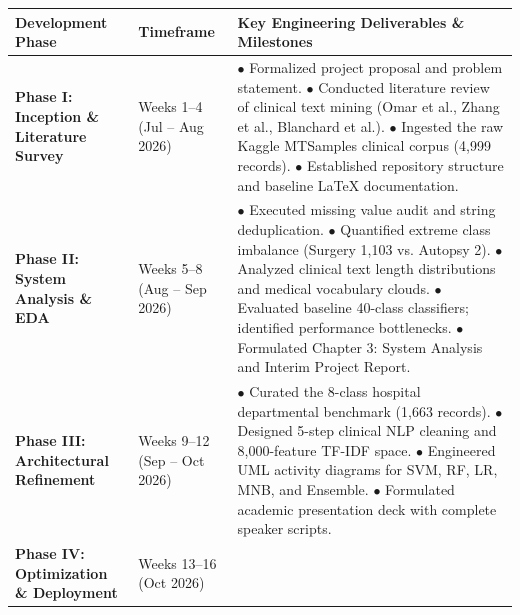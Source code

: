 \begin{table}[H]
\centering
\footnotesize
\renewcommand{\arraystretch}{0.95}
\setlength{\tabcolsep}{4pt}
\begin{tabularx}{\linewidth}{|>{\raggedright\arraybackslash}p{2.6cm}|>{\raggedright\arraybackslash}p{2.4cm}|>{\raggedright\arraybackslash}X|}
\hline
\textbf{Development Phase} & \textbf{Timeframe} & \textbf{Key Engineering Deliverables \& Milestones} \\
\hline
\textbf{Phase I: Inception \& Literature Survey} & Weeks 1--4 \newline (Jul -- Aug 2026) & 
$\bullet$ Formalized project proposal and problem statement. \newline
$\bullet$ Conducted literature review of clinical text mining (Omar et al., Zhang et al., Blanchard et al.). \newline
$\bullet$ Ingested the raw Kaggle MTSamples clinical corpus (4,999 records). \newline
$\bullet$ Established repository structure and baseline LaTeX documentation. \\
\hline
\textbf{Phase II: System Analysis \& EDA} & Weeks 5--8 \newline (Aug -- Sep 2026) & 
$\bullet$ Executed missing value audit and string deduplication. \newline
$\bullet$ Quantified extreme class imbalance (Surgery 1,103 vs. Autopsy 2). \newline
$\bullet$ Analyzed clinical text length distributions and medical vocabulary clouds. \newline
$\bullet$ Evaluated baseline 40-class classifiers; identified performance bottlenecks. \newline
$\bullet$ Formulated Chapter 3: System Analysis and Interim Project Report. \\
\hline
\textbf{Phase III: Architectural Refinement} & Weeks 9--12 \newline (Sep -- Oct 2026) & 
$\bullet$ Curated the 8-class hospital departmental benchmark (1,663 records). \newline
$\bullet$ Designed 5-step clinical NLP cleaning and 8,000-feature TF-IDF space. \newline
$\bullet$ Engineered UML activity diagrams for SVM, RF, LR, MNB, and Ensemble. \newline
$\bullet$ Formulated academic presentation deck with complete speaker scripts. \\
\hline
\textbf{Phase IV: Optimization \& Deployment} & Weeks 13--16 \newline (Oct 2026) & 

\end{tabularx}
\end{table}

